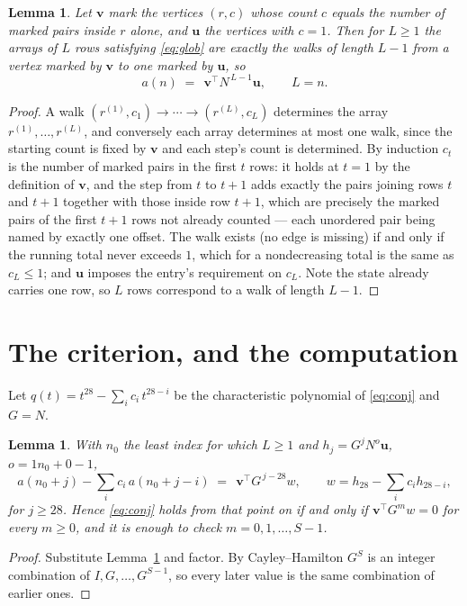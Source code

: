 \documentclass[11pt,a4paper]{article}
\theoremstyle{plain}
\newtheorem{lemma}[theorem]{Lemma}
\theoremstyle{definition}
\begin{document}
\begin{lemma}\label{lem:walk}
Let $\mathbf{v}$ mark the vertices $(r,c)$ whose count $c$ equals the number of marked pairs
inside $r$ alone, and $\mathbf{u}$ the vertices with $c=1$. Then for $L\ge1$ the arrays
of $L$ rows satisfying \eqref{eq:glob} are exactly the walks of length $L-1$ from a
vertex marked by $\mathbf{v}$ to one marked by $\mathbf{u}$, so
\[
a(n)\;=\;\,\mathbf{v}^{\!\top}N^{\,L-1}\mathbf{u},\qquad L=n .
\]
\end{lemma}

\begin{proof}
A walk $(r^{(1)},c_1)\to\cdots\to(r^{(L)},c_L)$ determines the array
$r^{(1)},\dots,r^{(L)}$, and conversely each array determines at most one walk, since the
starting count is fixed by $\mathbf{v}$ and each step's count is determined. By induction
$c_t$ is the number of marked pairs in the first $t$ rows: it holds at $t=1$ by the
definition of $\mathbf{v}$, and the step from $t$ to $t+1$ adds exactly the pairs joining
rows $t$ and $t+1$ together with those inside row $t+1$, which are precisely the marked
pairs of the first $t+1$ rows not already counted --- each unordered pair being named by
exactly one offset. The walk exists (no edge is missing) if and only if the running total
never exceeds $1$, which for a nondecreasing total is the same as $c_L\le1$; and
$\mathbf{u}$ imposes the entry's requirement on $c_L$. Note the state already carries one
row, so $L$ rows correspond to a walk of length $L-1$.
\end{proof}

\section{The criterion, and the computation}

Let $q(t)=t^{28}-\sum_i c_i\,t^{28-i}$ be the characteristic polynomial of
\eqref{eq:conj} and $G=N$.

\begin{lemma}\label{lem:crit}
With $n_0$ the least index for which $L\ge1$ and $h_j=G^{j}N^{o}\mathbf{u}$,
$o=1n_0+0-1$,
\[
a(n_0+j)-\sum_i c_i\,a(n_0+j-i)\;=\;\,\mathbf{v}^{\!\top}G^{\,j-28}w,
\qquad w=h_{28}-\sum_i c_i h_{28-i},
\]
for $j\ge28$. Hence \eqref{eq:conj} holds from that point on if and only if
$\mathbf{v}^{\!\top}G^{m}w=0$ for every $m\ge0$, and it is enough to check
$m=0,1,\dots,S-1$.
\end{lemma}

\begin{proof}
Substitute Lemma~\ref{lem:walk} and factor. By Cayley--Hamilton $G^{S}$ is an integer
combination of $I,G,\dots,G^{S-1}$, so every later value is the same combination of earlier
ones.
\end{proof}
\end{document}

